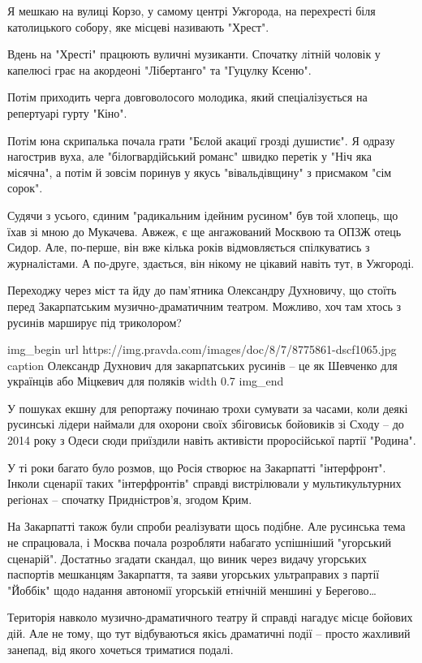 Я мешкаю на вулиці Корзо, у самому центрі Ужгорода, на перехресті біля
католицького собору, яке місцеві називають "Хрест".

Вдень на "Хресті" працюють вуличні музиканти. Спочатку літній чоловік у
капелюсі грає на акордеоні "Лібертанго" та "Гуцулку Ксеню".

Потім приходить черга довговолосого молодика, який спеціалізується на
репертуарі гурту "Кіно".

Потім юна скрипалька почала грати "Бєлой акациї грозді душистиє". Я одразу
нагострив вуха, але "білогвардійський романс" швидко перетік у "Ніч яка
місячна", а потім й зовсім поринув у якусь "вівальдівщину" з присмаком "сім
сорок".

Судячи з усього, єдиним "радикальним ідейним русином" був той хлопець, що їхав
зі мною до Мукачева. Авжеж, є ще ангажований Москвою та ОПЗЖ отець Сидор. Але,
по-перше, він вже кілька років відмовляється спілкуватись з журналістами. А
по-друге, здається, він нікому не цікавий навіть тут, в Ужгороді.

Переходжу через міст та йду до пам’ятника Олександру Духновичу, що стоїть перед
Закарпатським музично-драматичним театром. Можливо, хоч там хтось з русинів
марширує під триколором?

\ifcmt
img_begin 
	url https://img.pravda.com/images/doc/8/7/8775861-dscf1065.jpg
	caption Олександр Духнович для закарпатських русинів – це як Шевченко для українців або Міцкевич для поляків
	width 0.7
img_end
\fi

У пошуках екшну для репортажу починаю трохи сумувати за часами, коли деякі
русинські лідери наймали для охорони своїх збіговиськ бойовиків зі Сходу – до
2014 року з Одеси сюди приїздили навіть активісти проросійської партії
"Родина".

У ті роки багато було розмов, що Росія створює на Закарпатті "інтерфронт".
Інколи сценарії таких "інтерфронтів" справді вистрілювали у мультикультурних
регіонах – спочатку Придністров’я, згодом Крим.

На Закарпатті також були спроби реалізувати щось подібне. Але русинська тема не
спрацювала, і Москва почала розробляти набагато успішніший "угорський
сценарій". Достатньо згадати скандал, що виник через видачу угорських паспортів
мешканцям Закарпаття, та заяви угорських ультраправих з партії "Йоббік" щодо
надання автономії угорській етнічній меншині у Берегово…

Територія навколо музично-драматичного театру й справді нагадує місце бойових
дій. Але не тому, що тут відбуваються якісь драматичні події – просто жахливий
занепад, від якого хочеться триматися подалі.

